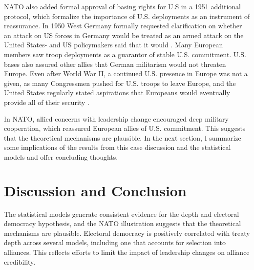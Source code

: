 \documentclass[12pt]{article}
\begin{document}
NATO also added formal approval of basing rights for U.S in a 1951 additional protocol, which formalize the importance of U.S. deployments as an instrument of reassurance. 
In 1950 West Germany formally requested clarification on whether an attack on US forces in Germany would be treated as an armed attack on the United States- and US policymakers said that it would \citep[pg. 395]{Acheson1969}.  
Many European members saw troop deployments as a guarantor of stable U.S. commitment. 
U.S. bases also assured other allies that German militarism would not threaten Europe. 
Even after World War II, a continued U.S. presence in Europe was not a given, as many Congressmen pushed for U.S. troops to leave Europe, and the United States regularly stated aspirations that Europeans would eventually provide all of their security \citep[pg. 20]{Sayle2019}. 



In NATO, allied concerns with leadership change encouraged deep military cooperation, which reassured European allies of U.S. commitment. 
This suggests that the theoretical mechanisms are plausible. 
In the next section, I summarize some implications of the results from this case discussion and the statistical models and offer concluding thoughts. 



\section{Discussion and Conclusion} 


The statistical models generate consistent evidence for the depth and electoral democracy hypothesis, and the NATO illustration suggests that the theoretical mechanisms are plausible. 
Electoral democracy is positively correlated with treaty depth across several models, including one that accounts for selection into alliances. 
This reflects efforts to limit the impact of leadership changes on alliance credibility. 
\end{document}
